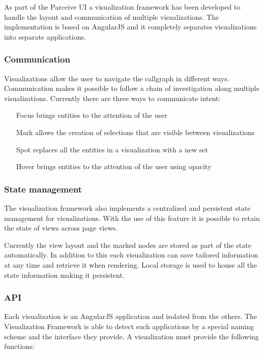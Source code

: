 As part of the Parceive UI a visualization framework has been developed to handle the layout and communication of multiple visualizations. The implementation is based on AngularJS and it completely separates visualizations into separate applications.

\subsubsection{Communication}

Visualizations allow the user to navigate the callgraph in different ways. Communication makes it possible to follow a chain of investigation along multiple visualizations. Currently there are three ways to communicate intent:

\begin{itemize}
	\item[Focus] brings entities to the attention of the user
	\item[Mark] allows the creation of selections that are visible between visualizations
	\item[Spot] replaces all the entities in a visualization with a new set
	\item[Hover] brings entities to the attention of the user using opacity
\end{itemize}

\subsubsection{State management}

The visualization framework also implements a centralized and persistent state management for visualizations. With the use of this feature it is possible to retain the state of views across page views.

Currently the view layout and the marked nodes are stored as part of the state automatically. In addition to this each visualization can save tailored information at any time and retrieve it when rendering. Local storage is used to house all the state information making it persistent.

\subsubsection{API}
Each visualization is an AngularJS application and isolated from the others. The Visualization Framework is able to detect such applications by a special naming scheme and the interface they provide. A visualization must provide the following functions:

